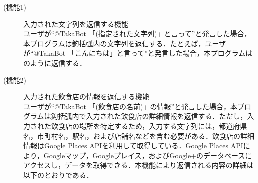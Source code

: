 \documentclass[12pt]{jsarticle}
\begin{document}
\begin{description}
\item[(機能1)]  入力された文字列を返信する機能 \\
  ユーザが``@TakaBot 「(指定された文字列)」と言って''と発言した場合，本プログラムは鉤括弧内の文字列を返信する．たとえば，ユーザが``@TakaBot 「こんにちは」と言って''と発言した場合，本プログラムはのように返信する．

\item[(機能2)]  入力された飲食店の情報を返信する機能 \\
  ユーザが``@TakaBot 「(飲食店の名前)」の情報''と発言した場合，本プログラムは鉤括弧内で入力された飲食店の詳細情報を返信する．ただし，入力された飲食店の場所を特定するため，入力する文字列には，都道府県名，市町村名，駅名，および店舗名などを含む必要がある．飲食店の詳細情報はGoogle Places API\cite{placesapi}を利用して取得している．Google Places APIにより，Googleマップ\cite{googlemaps}，Googleプレイス\cite{googleplace}，およびGoogle+\cite{googleplus}のデータベースにアクセスし，データを取得できる．本機能により返信される内容の詳細は以下のとおりである．
  

\end{description}
\end{document}
